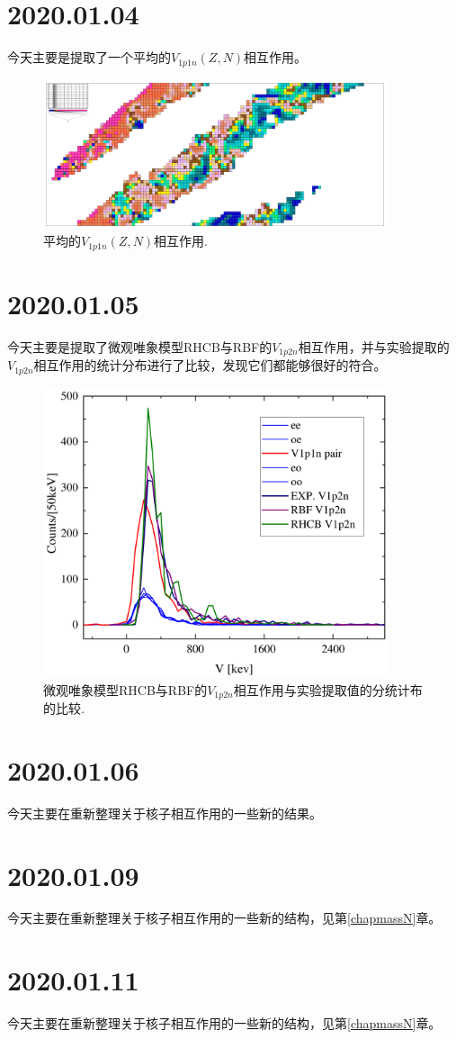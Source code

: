 \section{2020.01.04}
今天主要是提取了一个平均的$V_{1p1n}(Z,N)$相互作用。
\begin{figure}[H]
\centering
\includegraphics[width=0.9\textwidth]{figure/aV1p1npair.pdf}
\caption{平均的$V_{1p1n}(Z,N)$相互作用.\label{fig_aV1p1npair}}
\end{figure}

\section{2020.01.05}
今天主要是提取了微观唯象模型RHCB与RBF的$V_{1p2n}$相互作用，并与实验提取的$V_{1p2n}$相互作用的统计分布进行了比较，发现它们都能够很好的符合。
\begin{figure}[H]
\centering
\includegraphics[width=0.9\textwidth]{figure/V1p2npair.pdf}
\caption{微观唯象模型RHCB与RBF的$V_{1p2n}$相互作用与实验提取值的分统计布的比较.\label{fig_V1p2npair}}
\end{figure}

\section{2020.01.06}
今天主要在重新整理关于核子相互作用的一些新的结果。

\section{2020.01.09}
今天主要在重新整理关于核子相互作用的一些新的结构，见第\ref{chapmassN}章。

\section{2020.01.11}
今天主要在重新整理关于核子相互作用的一些新的结构，见第\ref{chapmassN}章。